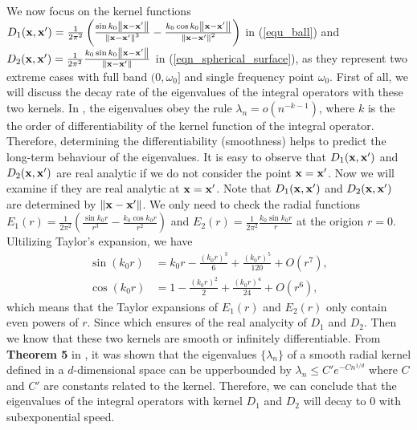 \documentclass[12pt,draftclsnofoot,journal,onecolumn]{IEEEtran}
\begin{document}
{\color{red}

We now focus on the kernel functions $D_1({\bf x},{\bf x}')=\frac{1}{2\pi^2} \left( \frac{\sin k_0\left\| {\bf x}-{\bf x}' \right\|}{\left\| {\bf x}-{\bf x}' \right\|^3}-\frac{k_0\cos k_0\left\| {\bf x}-{\bf x}' \right\|}{\left\| {\bf x}-{\bf x}' \right\|^2} \right)$ in (\ref{equ_ball}) and $D_2({\bf x},{\bf x}') = \frac{1}{2\pi^2} \frac{k_0\sin k_0 \left\| {\bf x}-{\bf x}' \right\|}{\left\|  {\bf x}-{\bf x}' \right\|}$ in (\ref{eqn_spherical_surface}), as they represent two extreme cases with full band $(0,\omega_0]$ and single frequency point $\omega_0$. First of all, we will discuss the decay rate of the eigenvalues of the integral operators with these two kernels. In \cite{reade1983eigen}, the eigenvalues obey the rule $\lambda_n  = o(n^{-k-1})$, where $k$ is the the order of differentiability of the kernel function of the integral operator. Therefore, determining the differentiability (smoothness) helps to predict the long-term behaviour of the eigenvalues.
It is easy to observe that $D_1({\bf x},{\bf x}')$ and $D_2({\bf x},{\bf x}')$ are real analytic if we do not consider the point ${\bf x} = {\bf x}'$. Now we will examine if they are real analytic at ${\bf x} = {\bf x}'$. 
Note that $D_1({\bf x},{\bf x}')$ and $D_2({\bf x},{\bf x}')$ are determined by $\left\|{\bf x}-{\bf x}'\right\|$. We only need to check the radial functions $E_1(r) = \frac{1}{2\pi^2} \left( \frac{\sin k_0 r}{r^3} - \frac{k_0 \cos k_0 r}{r^2} \right)$ and $E_2(r) = \frac{1}{2 \pi^2} \frac{k_0 \sin k_0 r}{r}$ at the origion $r = 0$. Ultilizing Taylor's expansion, we have 
\begin{equation}\begin{aligned}\sin(k_0r)&=k_0r-\frac{(k_0r)^3}{6}+\frac{(k_0r)^5}{120}+O(r^7),\\\cos(k_0r)&=1-\frac{(k_0r)^2}{2}+\frac{(k_0r)^4}{24}+O(r^6),\end{aligned}\end{equation}
which means that the Taylor expansions of $E_1(r)$ and $E_2(r)$ only contain even powers of $r$. Since  which ensures of the real analycity of $D_1$ and $D_2$. Then we know that these two kernels are smooth or infinitely differentiable. From {\bf Theorem 5} in \cite{belkin2018approximation}, it was shown that the eigenvalues $\{\lambda_n\}$ of a smooth radial kernel defined in a $d$-dimensional space can be upperbounded by $\lambda_n \leqslant C' e^{-C n^{1/d}}$ where $C$ and $C'$ are constants related to the kernel. Therefore, we can conclude that the eigenvalues of the integral operators with kernel $D_1$ and $D_2$ will decay to 0 with subexponential speed.   

}
\end{document}
